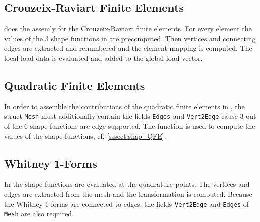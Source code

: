 
\subsection{Crouzeix-Raviart Finite Elements} 

  does the assemly for the Crouzeix-Raviart finite elements. For every element the values of the 3 shape functions in  are precomputed. Then vertices and connecting edges are extracted and renumbered and the element mapping is computed. The local load data is evaluated and added to the global load vector.




\subsection{Quadratic Finite Elements} 

 In order to assemble the contributions of the quadratic finite elements in \linebreak
 , the struct {\tt Mesh} must additionally contain the fields {\tt Edges} and {\tt Vert2Edge} cause 3 out of the 6 shape functions are edge supported. The function  is used to compute the values of the shape functions, cf. \ref{sssect:shap_QFE}.




\subsection{Whitney 1-Forms} 

 In  the shape functions  are evaluated at the quadrature points. The vertices and edges are extracted from the mesh and the transformation is computed. %
Because the Whitney 1-forms are connected to edges, the fields {\tt Vert2Edge} and {\tt Edges} of {\tt Mesh} are also required.


